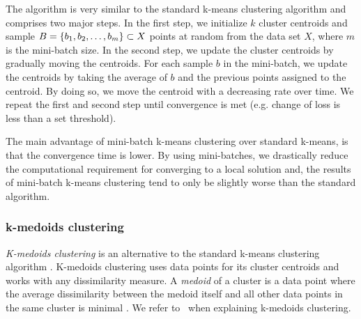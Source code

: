 The algorithm is very similar to the standard k-means clustering algorithm and comprises two major steps. In the first step, we initialize $k$ cluster centroids and sample $B=\left\{b_1, b_2, \ldots, b_m\right\} \subset X$ points at random from the data set $X$, where $m$ is the mini-batch size. In the second step, we update the cluster centroids by gradually moving the centroids. For each sample $b$ in the mini-batch, we update the centroids by taking the average of $b$ and the previous points assigned to the centroid. By doing so, we move the centroid with a decreasing rate over time. We repeat the first and second step until convergence is met (e.g. change of loss is less than a set threshold).

The main advantage of mini-batch k-means clustering over standard k-means, is that the convergence time is lower. By using mini-batches, we drastically reduce the computational requirement for converging to a local solution and, the results of mini-batch k-means clustering tend to only be slightly worse than the standard algorithm.

\subsubsection{k-medoids clustering}
\label{sec:k-medoids-clustering}
\textit{K-medoids clustering} is an alternative to the standard k-means clustering algorithm \cites{Kaufman1990}[p. 427 - 428]{bishop2006}. K-medoids clustering uses data points for its cluster centroids and works with any dissimilarity measure. A \textit{medoid} of a cluster is a data point where the average dissimilarity between the medoid itself and all other data points in the same cluster is minimal \cite{Kaufman1990}. We refer to \cites{Kaufman1990}[p. 427 - 428]{bishop2006}\, when explaining k-medoids clustering.

